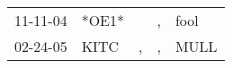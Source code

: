 \begin{supertabular}{p{0.07\textwidth}p{0.06\textwidth}p{0.02\textwidth}p{0.02\textwidth}p{0.06\textwidth}}
 11-11-04\textsuperscript{} &                   *OE1* &    &  , &  fool\textsuperscript{} \\
 02-24-05\textsuperscript{} &  KITC\textsuperscript{} &  , &  , &  MULL\textsuperscript{} \\
\end{supertabular}
